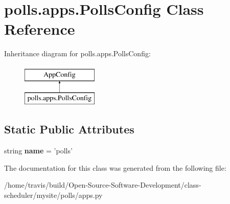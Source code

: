 \hypertarget{classpolls_1_1apps_1_1_polls_config}{\section{polls.\-apps.\-Polls\-Config Class Reference}
\label{classpolls_1_1apps_1_1_polls_config}
}
Inheritance diagram for polls.\-apps.\-Polls\-Config\-:\begin{figure}[H]
\begin{center}
\leavevmode
\includegraphics[height=2.000000cm]{classpolls_1_1apps_1_1_polls_config}
\end{center}
\end{figure}
\subsection*{Static Public Attributes}
\begin{DoxyCompactItemize}
\item 
\hypertarget{classpolls_1_1apps_1_1_polls_config_a969f90ecc73447a69938dc41cf33e29e}{string {\bfseries name} = 'polls'}\label{classpolls_1_1apps_1_1_polls_config_a969f90ecc73447a69938dc41cf33e29e}

\end{DoxyCompactItemize}


The documentation for this class was generated from the following file\-:\begin{DoxyCompactItemize}
\item 
/home/travis/build/\-Open-\/\-Source-\/\-Software-\/\-Development/class-\/scheduler/mysite/polls/apps.\-py\end{DoxyCompactItemize}
